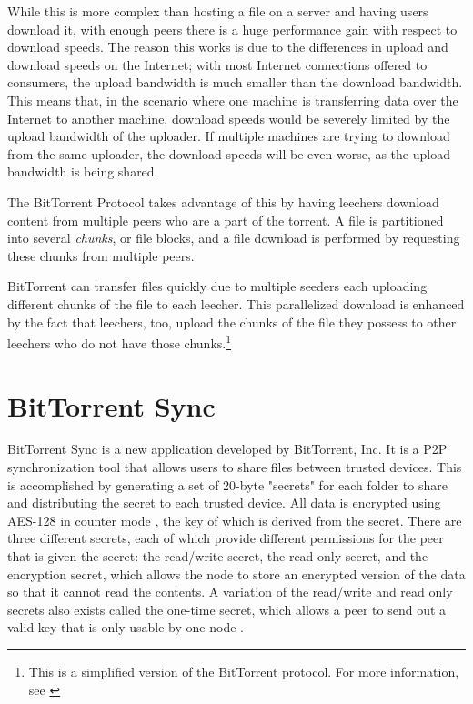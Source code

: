 \documentclass[12pt]{report}
\begin{document}
While this is more complex than hosting a file on a server and having users download it, with enough peers there is a huge performance gain with respect to download speeds. The reason this works is due to the differences in upload and download speeds on the Internet; with most Internet connections offered to consumers, the upload bandwidth is much smaller than the download bandwidth. This means that, in the scenario where one machine is transferring data over the Internet to another machine, download speeds would be severely limited by the upload bandwidth of the uploader. If multiple machines are trying to download from the same uploader, the download speeds will be even worse, as the upload bandwidth is being shared.

The BitTorrent Protocol takes advantage of this by having leechers download content from multiple peers who are a part of the torrent. A file is partitioned into several \textit{chunks}, or file blocks, and a file download is performed by requesting these chunks from multiple peers. %

BitTorrent can transfer files quickly due to multiple seeders each uploading different chunks of the file to each leecher. This parallelized download is enhanced by the fact that leechers, too, upload the chunks of the file they possess to other leechers who do not have those chunks.\footnote{This is a simplified version of the BitTorrent protocol. For more information, see \cite{bittorrentProtocol}}

\section{BitTorrent Sync}
BitTorrent Sync is a new application developed by BitTorrent, Inc. It is a P2P synchronization tool that allows users to share files between trusted devices. This is accomplished by generating a set of 20-byte "secrets" for each folder to share and distributing the secret to each trusted device. All data is encrypted using AES-128 in counter mode \cite{btsynctech}, the key of which is derived from the secret. There are three different secrets, each of which provide different permissions for the peer that is given the secret: the read/write secret, the read only secret, and the encryption secret, which allows the node to store an encrypted version of the data so that it cannot read the contents. A variation of the read/write and read only secrets also exists called the one-time secret, which allows a peer to send out a valid key that is only usable by one node \cite{btsyncuserguide}.
\end{document}
